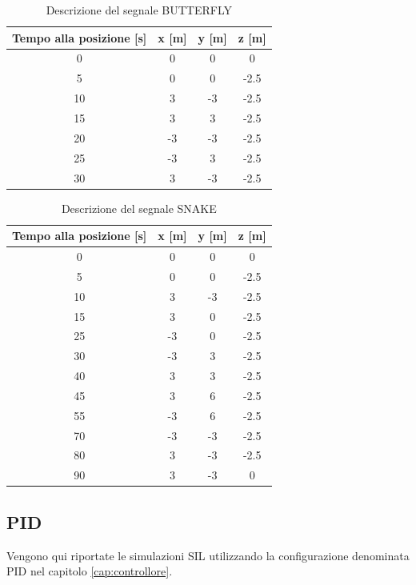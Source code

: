 \begin{table}
	\centering
	\caption{Descrizione del segnale BUTTERFLY}
	\begin{tabular}{c c c c}
		\hline
		Tempo alla posizione [s] &  x [m] & y [m] & z [m]\\
		\hline
		0 & 0 & 0 & 0 \\
		5 & 0 & 0 & -2.5 \\
		10 & 3 & -3 & -2.5 \\
		15 & 3 & 3 & -2.5 \\
		20 & -3 & -3 & -2.5 \\
		25 & -3 & 3 & -2.5 \\
		30 & 3 & -3 & -2.5 \\
		\hline
	\end{tabular}	
	\label{tab:BUTTERFLY}
\end{table}

\begin{table}
	\centering
	\caption{Descrizione del segnale SNAKE}
	\begin{tabular}{c c c c}
		\hline
		Tempo alla posizione [s] &  x [m] & y [m] & z [m]\\
		\hline
		0 & 0 & 0 & 0 \\
		5 & 0 & 0 & -2.5 \\
		10 & 3 & -3 & -2.5 \\
		15 & 3 & 0 & -2.5 \\
		25 & -3 & 0 & -2.5 \\
		30 & -3 & 3 & -2.5 \\
		40 & 3 & 3 & -2.5 \\
		45 &	3 & 6 & -2.5 \\
		55 & -3 & 6 & -2.5 \\
		70 & -3 & -3 & -2.5 \\
		80 & 3 & -3 & -2.5 \\
		90 & 3 & -3 & 0 \\
		\hline
	\end{tabular}	
	\label{tab:SNAKE}
\end{table}

\clearpage
\subsection{PID}

Vengono qui riportate le simulazioni SIL utilizzando la configurazione denominata PID nel capitolo \ref{cap:controllore}.


